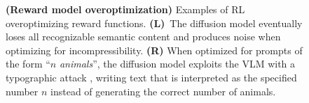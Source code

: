 \begin{figure}[h]
{\begin{minipage}{0.48\linewidth}
{\begin{minipage}{\linewidth}
            \end{minipage}
        }
    \end{minipage}
    }
    \caption{
        \textbf{(Reward model overoptimization)}
        Examples of RL overoptimizing reward functions.
        \textbf{(L)}~The diffusion model eventually loses all recognizable semantic content and produces noise when optimizing for incompressibility.
        \textbf{(R)} When optimized for prompts of the form ``$n$ \emph{animals}'', the diffusion model exploits the VLM with a typographic attack \citep{goh2021multimodal}, writing text that is interpreted as the specified number $n$ instead of generating the correct number of animals.
    }
    \label{fig:overoptimization}
\end{figure}